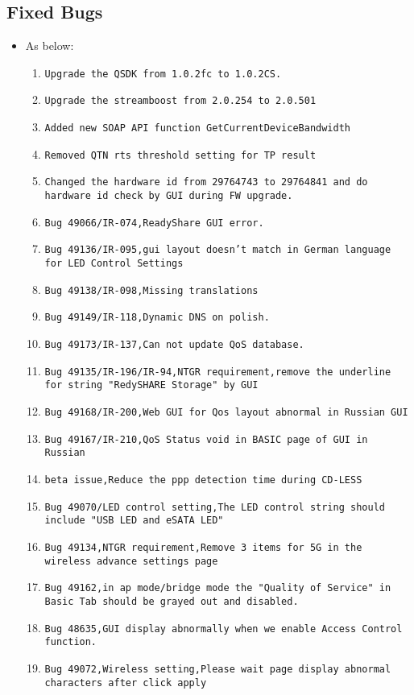 \documentclass[12pt]{report}
\begin{document}
    \subsection{Fixed Bugs}
    \begin{itemize}
    \item As below:
    	\begin{enumerate}
		\item \texttt{Upgrade the QSDK from 1.0.2fc to 1.0.2CS.}
		\item \texttt{Upgrade the streamboost from 2.0.254 to 2.0.501}
		\item \texttt{Added new SOAP API function GetCurrentDeviceBandwidth}
		\item \texttt{Removed QTN rts threshold setting for TP result}
		\item \texttt{Changed the hardware id from 29764743 to 29764841 and do hardware id check by GUI during FW upgrade.}
		\item \texttt{Bug 49066/IR-074,ReadyShare GUI error.}
		\item \texttt{Bug 49136/IR-095,gui layout doesn't match in German language for LED Control Settings}
		\item \texttt{Bug 49138/IR-098,Missing translations}
		\item \texttt{Bug 49149/IR-118,Dynamic DNS on polish.}
		\item \texttt{Bug 49173/IR-137,Can not update QoS database.}
		\item \texttt{Bug 49135/IR-196/IR-94,NTGR requirement,remove the underline for string "RedySHARE Storage" by GUI}
		\item \texttt{Bug 49168/IR-200,Web GUI for Qos layout abnormal in Russian GUI}
		\item \texttt{Bug 49167/IR-210,QoS Status void in BASIC page of GUI in Russian}
		\item \texttt{beta issue,Reduce the ppp detection time during CD-LESS}
		\item \texttt{Bug 49070/LED control setting,The LED control string should include "USB LED and eSATA LED"}
		\item \texttt{Bug 49134,NTGR requirement,Remove 3 items for 5G in the wireless advance settings page}
		\item \texttt{Bug 49162,in ap mode/bridge mode the "Quality of Service" in Basic Tab should be grayed out and disabled.}
		\item \texttt{Bug 48635,GUI display abnormally when we enable Access Control function.}
		\item \texttt{Bug 49072,Wireless setting,Please wait page display abnormal characters after click apply}

\end{enumerate}
\end{itemize}
\end{document}
